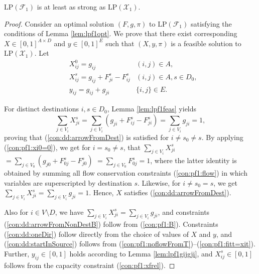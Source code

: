 \begin{prop}
\label{prop:f1strx1}
$\text{LP}(\mathcal{F}_1)$ is at least as strong as $\text{LP}(\mathcal{X}_1)$. 
\end{prop}
\begin{proof}
Consider an optimal solution $(F,g,\pi)$ to $\text{LP}(\mathcal{F}_1)$ satisfying the conditions of Lemma \ref{lem:lpf1opt}.
We prove that there exist corresponding $X\in[0,1]^{A\times D}$ and $y\in[0,1]^E$ such that $(X,y,\pi)$ is a feasible solution to $\text{LP}(\mathcal{X}_1)$.
Let
\begin{subequations}
\begin{align}
 & X_{ij}^0=g_{ij} &  (i,j)\in A, \label{eq:trangX0}\\
 & X_{ij}^s=g_{ij}+F_{ji}^s-F_{ij}^s &  (i,j)\in A, s\in D_0, \label{eq:trangX}\\
 & y_{ij}=g_{ij}+g_{ji} &  \{i,j\}\in E. \label{eq:trangy}
\end{align}
\end{subequations}

\noindent
For distinct destinations $i,s\in D_0$, Lemma \ref{lem:lpf1feas} yields
$$\sum_{j\in V_i}X_{ji}^s=\sum_{j\in V_i}\left(g_{ji}+F_{ij}^s-F_{ji}^s\right)=\sum_{j\in V_i}g_{ji}=1,$$
proving that (\ref{con:dd:arrowFromDest}) is satisfied for $i\neq s_0\neq s$. 
By applying (\ref{con:pf1:xi0=0}), we get for $i=s_0\neq s$, that
$\sum_{j\in V_i}X_{ji}^s$ $=\sum_{j\in V_0}\left(g_{j0}+F_{0j}^s-F_{j0}^s\right)$ $=\sum_{j\in V_0}F_{0j}^s=1$,
where the latter identity is obtained by summing all flow conservation constraints (\ref{con:pf1:flow}) in which variables are superscripted by destination $s$.
Likewise, for $i\neq s_0=s$, we get 
$\sum_{j\in V_i}X_{ji}^s=\sum_{j\in V_i}g_{ji}=1$.
Hence, $X$ satisfies (\ref{con:dd:arrowFromDest}).

Also for $i\in V\setminus D$, we have
$\sum_{j\in V_i}X_{ji}^s=\sum_{j\in V_i}g_{ji}$, and constraints (\ref{con:dd:arrowFromNonDestB}) follow from (\ref{con:pf1:B}).
Constraints (\ref{con:dd:oneDir}) follow directly from the choice of values of $X$ and $y$,
and (\ref{con:dd:startInSource}) follows from (\ref{con:pf1:noflowFromT})--(\ref{con:pf1:fitt=xit}).
Further, $y_{ij}\in[0,1]$ holds according to Lemma \ref{lem:lpf1gijgji}, and $X_{ij}^s\in[0,1]$ follows from the capacity constraint (\ref{con:pf1:xfrel}).


\end{proof}
